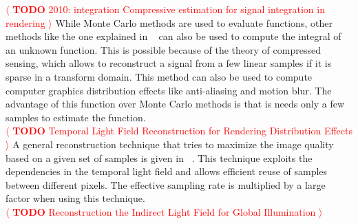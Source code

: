 \documentclass[review]{acmsiggraph}
\newcommand{\todo}[1]{\textcolor{red}{\(\langle\) \textbf{TODO} #1 \(\rangle\) }}
\begin{document}
\todo{2010: integration  Compressive estimation for signal integration in rendering}
While Monte Carlo methods are used to evaluate functions, 
other methods like the one explained in ~\cite{Sen:CompressiveSignalEstimation:2010} can also be used to compute the integral of an unknown function.
This is possible because of the theory of compressed sensing, which allows to reconstruct a signal from a few linear samples if it is sparse in a transform domain.
This method can also be used to compute computer graphics distribution effects like anti-aliasing and motion blur.
The advantage of this function over Monte Carlo methods is that is needs only a few samples to estimate the function.
\\

\todo{Temporal Light Field Reconstruction for Rendering Distribution Effects}
A general reconstruction technique that tries to maximize the image quality based on a given set of samples is given in ~\cite{Lehtinen2011sg}.
This technique exploits the dependencies in the temporal light field and allows efficient reuse of samples between different pixels.
The effective sampling rate is multiplied by a large factor when using this technique.
\\
\todo{Reconstruction the Indirect Light Field for Global Illumination}
\\
\end{document}
